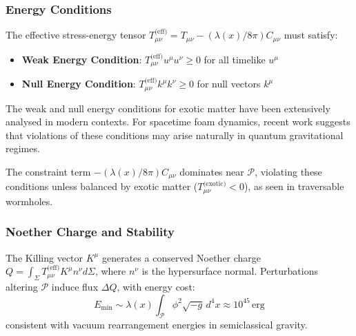 \documentclass[twocolumn]{article}
\newcommand{\fpit}{\mathcal{P}}
\newcommand{\lagrange}{\lambda(x)}
\begin{document}
	\subsubsection*{Energy Conditions}
	The effective stress-energy tensor \(T_{\mu\nu}^{\text{(eff)}} = T_{\mu\nu} - (\lagrange/8\pi) C_{\mu\nu}\) must satisfy:  
	\begin{itemize}
		\item \textbf{Weak Energy Condition}: \(T_{\mu\nu}^{\text{(eff)}} u^\mu u^\nu \geq 0\) for all timelike \(u^\mu\)  
		\item \textbf{Null Energy Condition}: \(T_{\mu\nu}^{\text{(eff)}} k^\mu k^\nu \geq 0\) for null vectors \(k^\mu\)  
	\end{itemize}
	
	The weak and null energy conditions for exotic matter have been extensively analysed in modern contexts\cite{Barcelo2011}. For spacetime foam dynamics, recent work\cite{Doplicher1994} suggests that violations of these conditions may arise naturally in quantum gravitational regimes.  
	
	The constraint term \(-(\lagrange/8\pi) C_{\mu\nu}\) dominates near \(\fpit\), violating these conditions unless balanced by exotic matter (\(T_{\mu\nu}^{\text{(exotic)}} < 0\)), as seen in traversable wormholes\cite{Morris-Thorne}.  
	
	\subsubsection*{Noether Charge and Stability}
	The Killing vector \(K^\mu\) generates a conserved Noether charge \(Q = \int_\Sigma T_{\mu\nu}^{\text{(eff)}} K^\mu n^\nu d\Sigma\), where \(n^\nu\) is the hypersurface normal. Perturbations altering \(\fpit\) induce flux \(\Delta Q\), with energy cost:
	\begin{equation}
		E_{\text{min}} \sim \lagrange \int_\fpit \phi^2 \sqrt{-g} \, d^4x \approx 10^{45} \, \text{erg}
	\end{equation}
	consistent with vacuum rearrangement energies in semiclassical gravity\cite{FordRoman1996}.
	
\end{document}
